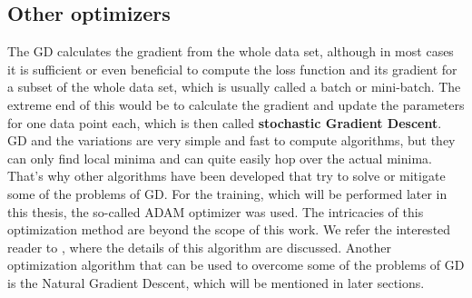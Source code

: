 \subsection{Other optimizers}
The GD calculates the gradient from the whole data set, although in most cases it is sufficient or even beneficial to compute the loss function and its gradient for a subset of the whole data set, which is usually called a batch or mini-batch. The extreme end of this would be to calculate the gradient and update the parameters for one data point each, which is then called \textbf{stochastic Gradient Descent}.
GD and the variations are very simple and fast to compute algorithms, but they can only find local minima and can quite easily hop over the actual minima. That's why other algorithms have been developed that try to solve or mitigate some of the problems of GD. For the training, which will be performed later in this thesis, the so-called ADAM optimizer was used. The intricacies of this optimization method are beyond the scope of this work. We refer the interested reader to \cite{adamPaper}, where the details of this algorithm are discussed. Another optimization algorithm that can be used to overcome some of the problems of GD is the Natural Gradient Descent, which will be mentioned in later sections.


